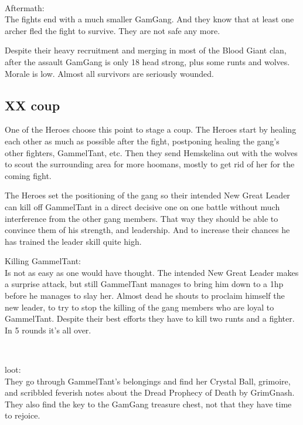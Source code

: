 \

Aftermath:\\
The fights end with a much smaller GamGang. And they know that at least one archer fled the fight to survive. They are not safe any more.

Despite their heavy recruitment and merging in most of the Blood Giant clan, after the assault GamGang is only 18 head strong, plus some runts and wolves. Morale is low. Almost all survivors are seriously wounded.



\subsection*{XX coup}

One of the Heroes choose this point to stage a coup. The Heroes start by healing each other as much as possible after the fight, postponing healing the gang's other fighters, GammelTant, etc. Then they send Hemskelina out with the wolves to scout the surrounding area for more hoomans, mostly to get rid of her for the coming fight.

The Heroes set the positioning of the gang so their intended New Great Leader can kill off GammelTant in a direct decisive one on one battle without much interference from the other gang members. That way they should be able to convince them of his strength, and leadership. And to increase their chances he has trained the leader skill quite high.

Killing GammelTant:\\
Is not as easy as one would have thought. The intended New Great Leader makes a surprise attack, but still GammelTant manages to bring him down to a 1hp before he manages to slay her. Almost dead he shouts to proclaim himself the new leader, to try to stop the killing of the gang members who are loyal to GammelTant. Despite their best efforts they have to kill two runts and a fighter.\\
In 5 rounds it's all over.

\

loot:\\
They go through GammelTant's belongings and find her Crystal Ball, grimoire, and scribbled feverish notes about the Dread Prophecy of Death by GrimGnash. They also find the key to the GamGang treasure chest, not that they have time to rejoice.

